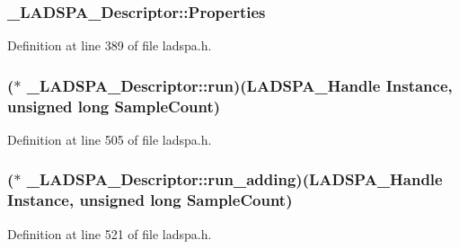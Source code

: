 \subsubsection[{\texorpdfstring{Properties}{Properties}}]{ \+\_\+\+L\+A\+D\+S\+P\+A\+\_\+\+Descriptor\+::\+Properties}\hypertarget{struct___l_a_d_s_p_a___descriptor_a7c5385a6bc9fba16b5ef02f41d6e3899}{}\label{struct___l_a_d_s_p_a___descriptor_a7c5385a6bc9fba16b5ef02f41d6e3899}


Definition at line 389 of file ladspa.\+h.

\subsubsection[{\texorpdfstring{run}{run}}]{($\ast$ \+\_\+\+L\+A\+D\+S\+P\+A\+\_\+\+Descriptor\+::run)({\bf L\+A\+D\+S\+P\+A\+\_\+\+Handle} Instance, unsigned long Sample\+Count)}\hypertarget{struct___l_a_d_s_p_a___descriptor_ab12cb9da61c3dc58c9272dfd48c0ad70}{}\label{struct___l_a_d_s_p_a___descriptor_ab12cb9da61c3dc58c9272dfd48c0ad70}


Definition at line 505 of file ladspa.\+h.

\subsubsection[{\texorpdfstring{run\+\_\+adding}{run_adding}}]{($\ast$ \+\_\+\+L\+A\+D\+S\+P\+A\+\_\+\+Descriptor\+::run\+\_\+adding)({\bf L\+A\+D\+S\+P\+A\+\_\+\+Handle} Instance, unsigned long Sample\+Count)}\hypertarget{struct___l_a_d_s_p_a___descriptor_a4205db566b20da9afb0d8927c2707795}{}\label{struct___l_a_d_s_p_a___descriptor_a4205db566b20da9afb0d8927c2707795}


Definition at line 521 of file ladspa.\+h.

